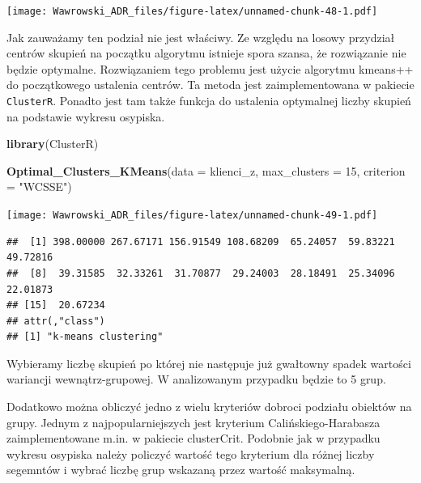 \documentclass[
]{book}
\newenvironment{Shaded}{\begin{snugshade}}{\end{snugshade}}
\newcommand{\DataTypeTok}[1]{\textcolor[rgb]{0.13,0.29,0.53}{#1}}
\newcommand{\DecValTok}[1]{\textcolor[rgb]{0.00,0.00,0.81}{#1}}
\newcommand{\KeywordTok}[1]{\textcolor[rgb]{0.13,0.29,0.53}{\textbf{#1}}}
\newcommand{\NormalTok}[1]{#1}
\newcommand{\StringTok}[1]{\textcolor[rgb]{0.31,0.60,0.02}{#1}}
\begin{document}
\texttt{[image: Wawrowski\_ADR\_files/figure-latex/unnamed-chunk-48-1.pdf]}

Jak zauważamy ten podział nie jest właściwy. Ze względu na losowy przydział centrów skupień na początku algorytmu istnieje spora szansa, że rozwiązanie nie będzie optymalne. Rozwiązaniem tego problemu jest użycie algorytmu kmeans++ do początkowego ustalenia centrów. Ta metoda jest zaimplementowana w pakiecie \texttt{ClusterR}. Ponadto jest tam także funkcja do ustalenia optymalnej liczby skupień na podstawie wykresu osypiska.

\begin{Shaded}
\begin{Highlighting}[]
\KeywordTok{library}\NormalTok{(ClusterR)}

\KeywordTok{Optimal_Clusters_KMeans}\NormalTok{(}\DataTypeTok{data =}\NormalTok{ klienci_z, }\DataTypeTok{max_clusters =} \DecValTok{15}\NormalTok{, }\DataTypeTok{criterion =} \StringTok{"WCSSE"}\NormalTok{)}
\end{Highlighting}
\end{Shaded}

\texttt{[image: Wawrowski\_ADR\_files/figure-latex/unnamed-chunk-49-1.pdf]}

\begin{verbatim}
##  [1] 398.00000 267.67171 156.91549 108.68209  65.24057  59.83221  49.72816
##  [8]  39.31585  32.33261  31.70877  29.24003  28.18491  25.34096  22.01873
## [15]  20.67234
## attr(,"class")
## [1] "k-means clustering"
\end{verbatim}

Wybieramy liczbę skupień po której nie następuje już gwałtowny spadek wartości wariancji wewnątrz-grupowej. W analizowanym przypadku będzie to 5 grup.

Dodatkowo można obliczyć jedno z wielu kryteriów dobroci podziału obiektów na grupy. Jednym z najpopularniejszych jest kryterium Calińskiego-Harabasza zaimplementowane m.in. w pakiecie clusterCrit. Podobnie jak w przypadku wykresu osypiska należy policzyć wartość tego kryterium dla różnej liczby segemntów i wybrać liczbę grup wskazaną przez wartość maksymalną.
\end{document}
